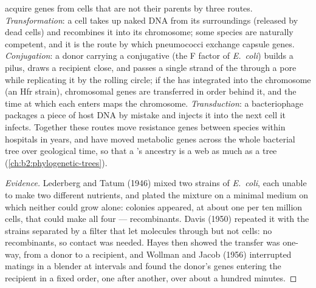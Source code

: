 \begin{definition}\label{def:b2:genome-diversification:hgt}
 acquire genes from cells that are not their parents by
three routes. \emph{Transformation}: a cell takes up naked DNA from
its surroundings (released by dead cells) and recombines it into its
chromosome; some species are naturally competent, and it is the
route by which pneumococci exchange capsule genes. \emph{Conjugation}:
a donor carrying a conjugative  (the F factor of
\emph{E.~coli}) builds a pilus, draws a recipient close, and passes a
single strand of the  through a pore while replicating it by
the rolling circle; if the  has integrated into the
chromosome (an Hfr strain), chromosomal genes are transferred in
order behind it, and the time at which each enters maps the
chromosome. \emph{Transduction}: a bacteriophage packages a piece of
host DNA by mistake and injects it into the next cell it infects.
Together these routes move resistance genes between species within
hospitals in years, and have moved metabolic genes across the whole
bacterial tree over geological time, so that a 's
ancestry is a web as much as a tree
(\cref{ch:b2:phylogenetic-trees}).
\end{definition}
\begin{proof}[Evidence]
Lederberg and Tatum (1946) mixed two strains of \emph{E.~coli}, each
unable to make two different nutrients, and plated the mixture on a
minimal medium on which neither could grow alone: colonies appeared,
at about one per ten million cells, that could make all four ---
recombinants. Davis (1950) repeated it with the strains separated by
a filter that let molecules through but not cells: no recombinants,
so contact was needed. Hayes then showed the transfer was one-way,
from a donor to a recipient, and Wollman and Jacob (1956)
interrupted matings in a blender at intervals and found the donor's
genes entering the recipient in a fixed order, one after another,
over about a hundred minutes.
\end{proof}


